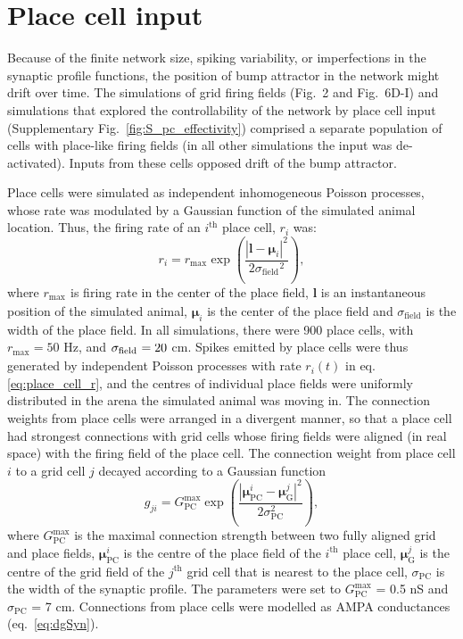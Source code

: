 \documentclass[a4paper,12pt]{article}
\newcommand{\ssc}[3]{\ensuremath{#1_{\text{#2}_{\text{#3}}}}}
\newcommand{\sigmasub}[1]{\ssc{\sigma}{\scriptsize{#1}}{}}
\begin{document}
\section{Place cell input} \label{sec:place_cells}

Because of the finite network size, spiking variability, or imperfections in
the synaptic profile functions, the position of bump attractor in the network
might drift over time. The simulations of grid firing fields (Fig.~2 and
Fig.~6D-I) and simulations that explored the controllability of the network
by place cell input (Supplementary Fig.~\ref{fig:S_pc_effectivity}) comprised a separate
population of cells with place-like firing fields (in all other simulations the
input was de-activated). Inputs from these cells opposed drift of the bump
attractor.

Place cells were simulated as independent inhomogeneous Poisson processes,
whose rate was modulated by a Gaussian function of the simulated animal
location. Thus, the firing rate of an $i^{\text{th}}$ place cell, $r_i$ was:
\begin{equation}
    r_i = \ssc{r}{max}{} \exp\left( \frac{|\mathbf{l} - \bm{\mu}_i|^2}{2
            \ssc{\sigma}{field}{}^2} \right),
    \label{eq:place_cell_r}
\end{equation}
where $\ssc{r}{max}{}$ is firing rate in the center of the place field,
$\mathbf{l}$ is an instantaneous position of the simulated animal,
$\bm{\mu}_i$ is the center of the place field and
$\ssc{\sigma}{field}{}$ is the width of the place field.
In all simulations,
there were 900 place cells, with $\ssc{r}{max}{} = 50$ Hz, and $\sigmasub{field}
= 20$ cm.  Spikes emitted by place cells were thus generated by independent
Poisson processes with rate $r_i(t)$ in eq. \eqref{eq:place_cell_r}, and the
centres of individual place fields were uniformly distributed in the arena the
simulated animal was moving in.
The connection weights from place cells were arranged in a divergent
manner, so that a place cell had strongest connections with grid cells whose
firing fields were aligned (in real space) with the firing field of the place
cell. The connection weight from place
cell $i$ to a grid cell $j$ decayed according to a Gaussian function
\begin{equation}
    g_{ji} = G_{\text{PC}}^{\text{max}} \exp\left( \frac{|\bm{\mu}_{\text{PC}}^{i} -
    \bm{\mu}_{\text{G}}^j|^2}{2\sigma_\text{PC}^2} \right),
    \label{eq:TG_pc_diverg_conn}
\end{equation}
where $G_{\text{PC}}^{\text{max}}$ is the maximal connection strength between
two fully aligned grid and place fields, $\bm{\mu}_{\text{PC}}^{i}$ is the
centre of the place field of the $i^{\text{th}}$ place cell,
$\bm{\mu}_{\text{G}}^j$ is the centre of the grid field of the $j^{\text{th}}$
grid cell that is nearest to the place cell, $\sigma_\text{PC}$ is the width of
the synaptic profile. The parameters were set to $G_{\text{PC}}^{\text{max}}$ =
0.5 nS and $\sigma_\text{PC}$ = 7 cm. Connections from place cells were modelled
as AMPA conductances (eq.~\ref{eq:dgSyn}).
\end{document}
